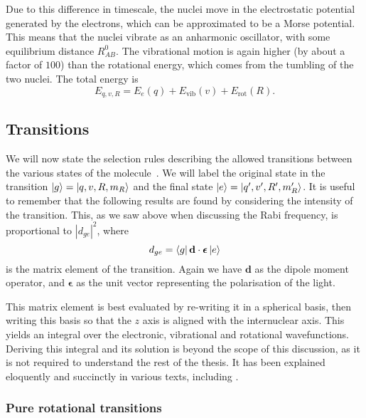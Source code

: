 Due to this difference in timescale, the nuclei move in the electrostatic potential
generated by the electrons, which can be approximated to be a Morse potential. This
means that the nuclei vibrate as an anharmonic oscillator, with some
equilibrium distance $R_{AB}^0$. The vibrational motion is again higher (by
about a factor of $100$) than the rotational energy, which comes from the
tumbling of the two nuclei. The total energy is
%
\begin{equation}
  E_{q,v,R} = E_e(q) + E_\text{vib}(v) + E_\text{rot}(R).
\end{equation}


\subsection{Transitions}
\label{theory:transitions}


We will now state the selection rules describing the allowed transitions
between the various states of the molecule~\cite{brown_carrington_2003}. We
will label the original state in the transition $\ket{g} = \ket{q, v, R, m_R}$
and the final state $\ket{e} = \ket{q', v', R', m_R'}$.
%
It is useful to remember that the following results are found by considering
the intensity of the transition. This, as we saw above when discussing the Rabi
frequency, is proportional to $|d_{ge}|^2$, where
%
\begin{equation}
  d_{ge} = \bra{g}\mathbf{d}\cdot\bm{\epsilon}\ket{e}
\end{equation}
%
is the matrix element of the transition. Again we have $\mathbf{d}$ as the
dipole moment operator, and $\bm{\epsilon}$ as the unit vector representing the
polarisation of the light.

This matrix element is best evaluated by re-writing it in a spherical basis,
then writing this basis so that the $z$ axis is aligned with the internuclear
axis. This yields an integral over the electronic, vibrational and rotational
wavefunctions. Deriving this integral and its solution is beyond the scope of
this discussion, as it is not required to understand the rest of the thesis. It
has been explained eloquently and succinctly in various texts, including
.

\subsubsection{Pure rotational transitions}

